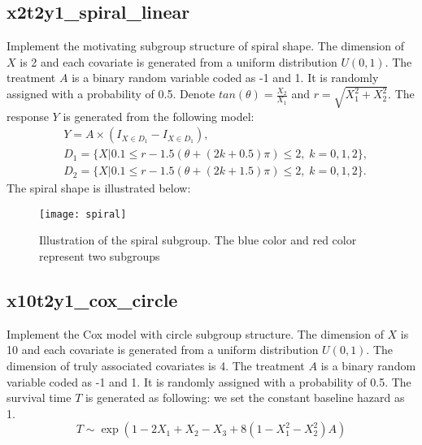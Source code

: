 \documentclass[12pt]{article}
\begin{document}
\subsection*{x2t2y1\_spiral\_linear}
Implement the motivating subgroup structure of spiral shape. The dimension of $X$ is 2 and each covariate is generated from a uniform distribution $U(0,1)$. The treatment $A$ is a binary random variable coded as -1 and 1. It is randomly assigned with a probability of 0.5.
Denote $tan(\theta) = \frac{X_2}{X_1}$ and $r = \sqrt{X_1^2+X_2^2}$.
The response $Y$ is generated from the following model: 
\begin{align*}
&Y = A\times (I_{X\in D_1}-I_{X\in D_1}) , \\
&D_1 = \big\{X|0.1\leq r - 1.5(\theta+(2k+0.5)\pi)\leq 2,\;k=0,1,2 \big\}, \\
&D_2 = \big\{X|0.1\leq r - 1.5(\theta+(2k+1.5)\pi)\leq 2,\;k=0,1,2 \big\}.
\end{align*}
The spiral shape is illustrated below:
\vspace{-5mm}
\begin{figure}[h]
	\centering
	\texttt{[image: spiral]}
	\vspace{-5mm}
	\caption{Illustration of the spiral subgroup. The blue color and red color represent two subgroups}
	\label{fig:spiral}
\end{figure}



\subsection*{x10t2y1\_cox\_circle}
Implement the Cox model with circle subgroup structure. The dimension of $X$ is 10 and each covariate is generated from a uniform distribution $U(0,1)$. The dimension of truly associated covariates is 4. The treatment $A$ is a binary random variable coded as -1 and 1. It is randomly assigned with a probability of 0.5. The survival time $T$ is generated as following: we set the constant baseline hazard as 1.
$$T \sim \exp(1 -2X_1 + X_2 -X_3 + 8(1-X_1^2-X_2^2)A )$$
\end{document}
